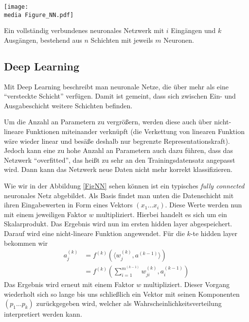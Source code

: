 \begin{dsafigure}
	\begin{center}
		\texttt{[image: \\media Figure\_NN.pdf]}
		\caption{Ein vollständig verbundenes neuronales Netzwerk mit $i$ Eingängen und $k$ Ausgängen, bestehend aus $n$ Schichten mit jeweils $m$ \glqq Neuronen\grqq .}

		\label{FigNN}
	\end{center}
\end{dsafigure}

\subsection{Deep Learning}

Mit Deep Learning beschreibt man neuronale Netze, die über mehr als eine \enquote{versteckte Schicht} verfügen. Damit ist gemeint, dass sich zwischen Ein- und Ausgabeschicht weitere Schichten befinden. 

Um die Anzahl an Parametern zu vergrößern, werden diese auch über nicht-lineare Funktionen miteinander verknüpft (die Verkettung von linearen Funktion wäre wieder linear und besäße deshalb nur begrenzte Representationskraft). Jedoch kann eine zu hohe Anzahl an Parametern auch dazu führen, dass das Netzwerk \enquote{overfitted}, das heißt zu sehr an den Trainingsdatensatz angepasst wird. Dann kann das Netzwerk neue Daten nicht mehr korrekt klassifizieren.

Wie wir in der Abbildung \ref{FigNN} sehen können ist ein typisches \emph{fully connected} neuronales Netz abgebildet. Als Basis findet man unten die Datenschicht mit ihren Eingabewerten in Form eines Vektors $(x_1 \dots x_i)$. Diese Werte werden nun mit einem jeweiligen Faktor $w$ multipliziert. Hierbei handelt es sich um ein Skalarprodukt. Das Ergebnis wird nun im ersten hidden layer abgespeichert. Darauf wird eine nicht-lineare Funktion angewendet. Für die $k$-te hidden layer bekommen wir
\begin{align*}
a_j^{(k)} &= f^{(k)} (\langle w_{j}^{(k)}, a^{(k-1)}\rangle)\\ &= f^{(k)} \left(\sum_{i=1}^{m^{(k-1)}} w_{ji}^{(k)},a_i^{(k-1)}\right)
\end{align*}
Das Ergebnis wird erneut mit einem Faktor $w$ multipliziert. Dieser Vorgang wiederholt sich so lange bis uns schließlich ein Vektor mit seinen Komponenten $(p_1 \dots p_k)$ zurückgegeben wird, welcher als Wahrscheinlichkeitsverteilung interpretiert werden kann.

